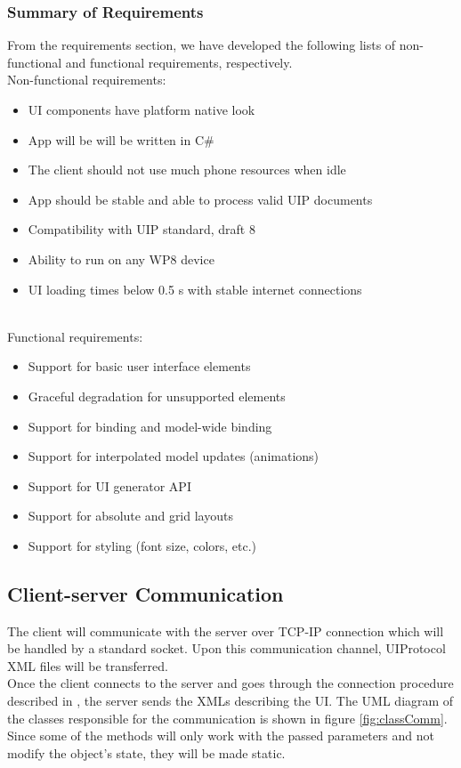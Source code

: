 \subsubsection{Summary of Requirements}
From the requirements section, we have developed the following lists of non-functional and functional requirements, respectively.
\\
Non-functional requirements:
\begin{itemize}
  \item UI components have platform native look
  \item App will be will be written in C\#
  \item The client should not use much phone resources when idle
  \item App should be stable and able to process valid UIP documents
  \item Compatibility with UIP standard, draft 8
  \item Ability to run on any WP8 device
  \item UI loading times below 0.5 s with stable internet connections
\end{itemize}
~\\
Functional requirements:
\begin{itemize}
  \item  Support for basic user interface elements
  \item Graceful degradation for unsupported elements
  \item  Support for binding and model-wide binding
  \item  Support for interpolated model updates (animations)
  \item  Support for UI generator API
  \item Support for absolute and grid layouts
  \item Support for styling (font size, colors, etc.)
\end{itemize}

\subsection{Client-server Communication}
The client will communicate with the server over TCP-IP connection which will be handled by a standard socket. Upon this communication channel, UIProtocol XML files will be transferred.\\
Once the client connects to the server and goes through the connection procedure described in \cite{uip}, the server sends the XMLs describing the UI. The UML diagram of the classes responsible for the communication is shown in figure \ref{fig:classComm}. Since some of the methods will only work with the passed parameters and not modify the object's state, they will be made static. 


